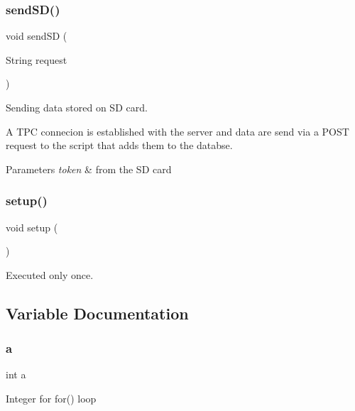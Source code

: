 \subsubsection{\texorpdfstring{send\+S\+D()}{sendSD()}}
{\footnotesize\ttfamily void send\+SD (\begin{DoxyParamCaption}\item[{String}]{request }\end{DoxyParamCaption})}



Sending data stored on SD card. 

A T\+PC connecion is established with the server and data are send via a P\+O\+ST request to the script that adds them to the databse. 
\begin{DoxyParams}{Parameters}
{\em token} & from the SD card \\
\hline
\end{DoxyParams}
\mbox{\label{_w_s_8ino_a4fc01d736fe50cf5b977f755b675f11d}} 
\subsubsection{\texorpdfstring{setup()}{setup()}}
{\footnotesize\ttfamily void setup (\begin{DoxyParamCaption}{ }\end{DoxyParamCaption})}



Executed only once. 



\subsection{Variable Documentation}
\mbox{\label{_w_s_8ino_aa4c2a5552e9bc49b1816ff532f558c74}} 
\subsubsection{\texorpdfstring{a}{a}}
{\footnotesize\ttfamily int a}

Integer for for() loop \mbox{\label{_w_s_8ino_ad43c3812e6d13e0518d9f8b8f463ffcf}} 
